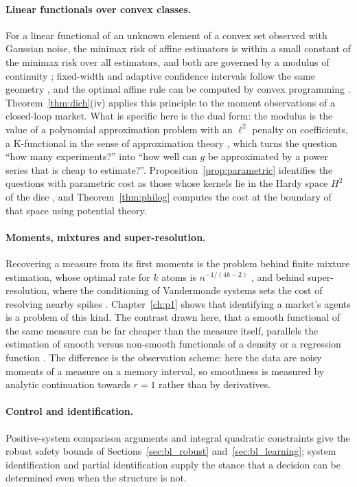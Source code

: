 \paragraph{Linear functionals over convex classes.} For a linear functional of an unknown element of a convex set observed with Gaussian noise, the minimax risk of affine estimators is within a small constant of the minimax risk over all estimators, and both are governed by a modulus of continuity \citep{t:ibragimov1984,t:donoho1994}; fixed-width and adaptive confidence intervals follow the same geometry \citep{t:cai2004}, and the optimal affine rule can be computed by convex programming \citep{t:juditsky2009}. Theorem~\ref{thm:dich}(iv) applies this principle to the moment observations of a closed-loop market. What is specific here is the dual form: the modulus is the value of a polynomial approximation problem with an $\ell^2$ penalty on coefficients, a K-functional in the sense of approximation theory \citep[Chapter~6]{t:devore1993}, which turns the question ``how many experiments?'' into ``how well can $g$ be approximated by a power series that is cheap to estimate?''. Proposition~\ref{prop:parametric} identifies the questions with parametric cost as those whose kernels lie in the Hardy space $H^2$ of the disc \citep{t:duren1970}, and Theorem~\ref{thm:philog} computes the cost at the boundary of that space using potential theory.

\paragraph{Moments, mixtures and super-resolution.} Recovering a measure from its first moments is the problem behind finite mixture estimation, whose optimal rate for $k$ atoms is $n^{-1/(4k-2)}$ \citep{t:heinrich2018,t:wu2020}, and behind super-resolution, where the conditioning of Vandermonde systems sets the cost of resolving nearby spikes \citep{t:candes2014,t:moitra2015}. Chapter~\ref{ch:p1} shows that identifying a market's agents is a problem of this kind. The contrast drawn here, that a smooth functional of the same measure can be far cheaper than the measure itself, parallels the estimation of smooth versus non-smooth functionals of a density or a regression function \citep{t:lepski1999,t:cai2011}. The difference is the observation scheme: here the data are noisy moments of a measure on a memory interval, so smoothness is measured by analytic continuation towards $r=1$ rather than by derivatives.

\paragraph{Control and identification.} Positive-system comparison arguments \citep{t:farina2000,t:rantzer2015} and integral quadratic constraints \citep{t:megretski1997} give the robust safety bounds of Sections~\ref{sec:bl_robust} and~\ref{sec:bl_learning}; system identification \citep{t:ljung1999} and partial identification \citep{t:manski2003} supply the stance that a decision can be determined even when the structure is not.


